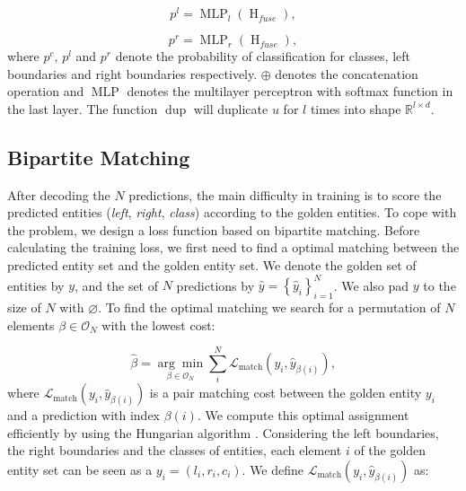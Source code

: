 \documentclass{article}
\begin{document}
\begin{equation}
    p^l = \operatorname{MLP}_l(\operatorname{H}_{fuse}),
\end{equation}

\begin{equation}
    p^r = \operatorname{MLP}_r(\operatorname{H}_{fuse}),
\end{equation}
where $p^c$, $p^l$ and $p^r$ denote the probability of classification for classes, left boundaries and right boundaries respectively. $\oplus$ denotes the concatenation operation and $\operatorname{MLP}$ denotes the multilayer perceptron with softmax function in the last layer. The function $\operatorname{dup}$ will duplicate $u$ for $l$ times into shape $\mathbb{R}^{l \times d}$. 


\subsection{Bipartite Matching}
After decoding the $N$ predictions, the main difficulty in training is to score the predicted entities (\textit{left}, \textit{right}, \textit{class}) according to the golden entities. To cope with the problem, we design a loss function based on bipartite matching. Before calculating the training loss, we first need to find a optimal matching between the predicted entity set and the golden entity set. We denote the golden set of entities by $y$, and the set of $N$ predictions by $\hat{y}=\left\{\hat{y}_{i}\right\}_{i=1}^{N}$. We also pad $y$ to the size of $N$ with $\varnothing$. To find the optimal matching we search for a permutation of $N$ elements $\beta \in \mathcal{O}_{N}$ with the lowest cost: 

\begin{equation}
\hat{\beta}=\underset{\beta \in \mathcal{O}_{N}}{\arg \min } \sum_{i}^{N} \mathcal{L}_{\operatorname{match}}\left(y_{i}, \hat{y}_{\beta(i)}\right),
\end{equation}
where $\mathcal{L}_{\operatorname{match}}\left(y_{i}, \hat{y}_{\beta(i)}\right)$ is a pair matching cost between the golden entity $y_i$ and a prediction with index $\beta(i)$. We compute this optimal assignment efficiently by using the Hungarian algorithm \cite{kuhn1955hungarian}. Considering the left boundaries, the right boundaries and the classes of entities, each element $i$ of the golden entity set can be seen as a $y_{i}=\left(l_{i}, r_{i}, c_{i}\right)$. We define $\mathcal{L}_{\operatorname{match}}\left(y_{i}, \hat{y}_{\beta(i)}\right)$ as:
\end{document}

